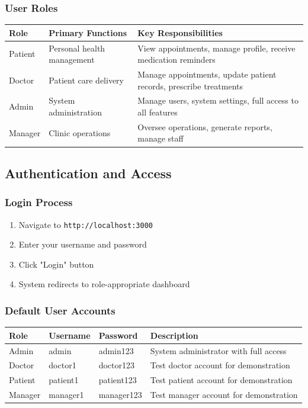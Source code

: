 \documentclass[12pt,a4paper]{article}
\begin{document}
\subsubsection{User Roles}

\begin{longtable}{|p{2cm}|p{4cm}|p{8cm}|}
\hline
\textbf{Role} & \textbf{Primary Functions} & \textbf{Key Responsibilities} \\
\hline
Patient & Personal health management & View appointments, manage profile, receive medication reminders \\
\hline
Doctor & Patient care delivery & Manage appointments, update patient records, prescribe treatments \\
\hline
Admin & System administration & Manage users, system settings, full access to all features \\
\hline
Manager & Clinic operations & Oversee operations, generate reports, manage staff \\
\hline
\end{longtable}

\subsection{Authentication and Access}

\subsubsection{Login Process}

\begin{enumerate}
    \item Navigate to \texttt{http://localhost:3000}
    \item Enter your username and password
    \item Click "Login" button
    \item System redirects to role-appropriate dashboard
\end{enumerate}

\subsubsection{Default User Accounts}

\begin{longtable}{|p{2cm}|p{3cm}|p{3cm}|p{6cm}|}
\hline
\textbf{Role} & \textbf{Username} & \textbf{Password} & \textbf{Description} \\
\hline
Admin & admin & admin123 & System administrator with full access \\
\hline
Doctor & doctor1 & doctor123 & Test doctor account for demonstration \\
\hline
Patient & patient1 & patient123 & Test patient account for demonstration \\
\hline
Manager & manager1 & manager123 & Test manager account for demonstration \\
\hline
\end{longtable}
\end{document}
